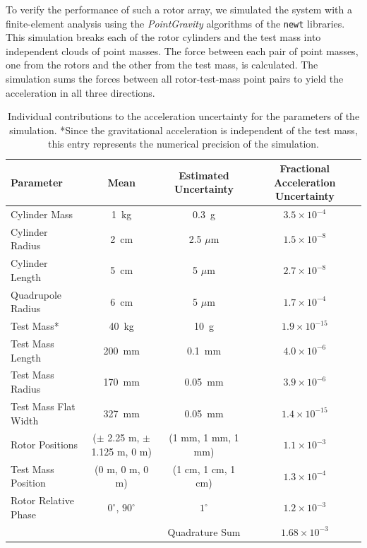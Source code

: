 \documentclass[superscriptaddress, twocolumn, prd]{revtex4-1}
\begin{document}
To verify the performance of such a rotor array, we simulated the system with a finite-element analysis using the \textit{PointGravity} algorithms of the \texttt{newt} libraries. \cite{Hagedorn, pgURL} This simulation breaks each of the rotor cylinders and the test mass into independent clouds of point masses. The force between each pair of point masses, one from the rotors and the other from the test mass, is calculated. The simulation sums the forces between all rotor-test-mass point pairs to yield the acceleration in all three directions.
\begin{widetext}
\begingroup
\setlength{\tabcolsep}{10pt} %
\renewcommand{\arraystretch}{1.5} %

\begin{table}[h!]
\begin{center}
\begin{tabular}{ |l|c|c|c| }
\hline
 Parameter & Mean & Estimated Uncertainty & Fractional Acceleration Uncertainty\\
 \hline

Cylinder Mass & 1~kg & 0.3~g & $3.5\times10^{-4}$\\
Cylinder Radius & 2~cm & 2.5 $\mu$m & $1.5\times10^{-8}$\\
Cylinder Length & 5~cm & 5 $\mu$m & $2.7\times10^{-8}$\\
Quadrupole Radius & 6~cm & 5 $\mu$m &$1.7\times10^{-4}$\\
Test Mass* & 40~kg & 10~g & $1.9\times10^{-15}$\\
Test Mass Length & 200~mm & 0.1~mm& $4.0\times10^{-6}$\\
Test Mass Radius & 170~mm & 0.05~mm& $3.9\times10^{-6}$\\
Test Mass Flat Width & 327~mm & 0.05~mm&$1.4\times10^{-15}$\\
Rotor Positions & ($\pm$ 2.25 m, $\pm$ 1.125 m, 0 m) & (1 mm, 1 mm, 1 mm) &$1.1\times10^{-3}$\\
Test Mass Position & (0 m, 0 m, 0 m) & (1 cm, 1 cm, 1 cm) &$1.3\times10^{-4}$\\
Rotor Relative Phase & $0^\circ$, $90^\circ$ & $1^\circ$ & $1.2\times10^{-3}$\\
 \hline
 \hline
& &Quadrature Sum  &$1.68\times10^{-3}$\\
\hline
 \end{tabular}
 \caption{Individual contributions to the acceleration uncertainty for the parameters of the simulation. *Since the gravitational acceleration is independent of the test mass, this entry represents the numerical precision of the simulation.}\label{uncert}
 \end{center}

\end{table}
\endgroup
\end{widetext}
\end{document}
